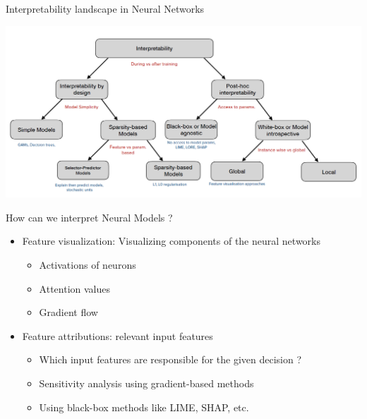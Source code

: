\documentclass[11pt,compress,t,notes=noshow, aspectratio=169, xcolor=table]{beamer}
\begin{document}
\begin{frame}[c]{Interpretability landscape in Neural Networks}
    
    \includegraphics[scale=.4]{baum5}
\end{frame}






\begin{frame}[c]{How can we interpret Neural Models ?}
	\begin{itemize}
		\item Feature visualization: Visualizing components of the neural networks
		\begin{itemize}
			\item Activations of neurons
			\item Attention values
			\item Gradient flow
		\end{itemize}
		\item Feature attributions: relevant input features
		\begin{itemize}
			\item Which input features are responsible for the given decision ?
			\item Sensitivity analysis using gradient-based methods
			\item Using black-box methods like LIME, SHAP, etc.
		\end{itemize}
	\end{itemize}
\end{frame}
\end{document}
